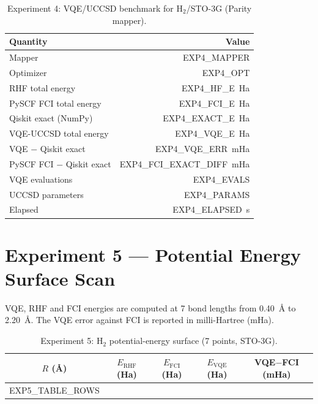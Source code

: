 \documentclass[11pt,a4paper]{article}
\begin{document}
\begin{table}[H]
\centering\small
\begin{tabular}{lr}
\toprule
Quantity & Value \\
\midrule
Mapper                           & EXP4\_MAPPER \\
Optimizer                        & EXP4\_OPT \\
RHF total energy                 & EXP4\_HF\_E~Ha \\
PySCF FCI total energy           & EXP4\_FCI\_E~Ha \\
Qiskit exact (NumPy)             & EXP4\_EXACT\_E~Ha \\
VQE-UCCSD total energy           & EXP4\_VQE\_E~Ha \\
VQE $-$ Qiskit exact             & EXP4\_VQE\_ERR~mHa \\
PySCF FCI $-$ Qiskit exact       & EXP4\_FCI\_EXACT\_DIFF~mHa \\
VQE evaluations                  & EXP4\_EVALS \\
UCCSD parameters                 & EXP4\_PARAMS \\
Elapsed                          & EXP4\_ELAPSED~s \\
\bottomrule
\end{tabular}
\caption{Experiment 4: VQE/UCCSD benchmark for H$_2$/STO-3G (Parity mapper).}
\end{table}

\section{Experiment 5 --- Potential Energy Surface Scan}

VQE, RHF and FCI energies are computed at 7 bond lengths from 0.40~\AA{} to
2.20~\AA. The VQE error against FCI is reported in milli-Hartree (mHa).

\begin{table}[H]
\centering\small\setlength{\tabcolsep}{5pt}
\begin{tabular}{S[table-format=1.3]
                S[table-format=2.10]
                S[table-format=2.10]
                S[table-format=2.10]
                S[table-format=+1.4]}
\toprule
{$R$ (\AA)} & {$E_\text{RHF}$ (Ha)} & {$E_\text{FCI}$ (Ha)}
            & {$E_\text{VQE}$ (Ha)} & {VQE$-$FCI (mHa)} \\
\midrule
EXP5\_TABLE\_ROWS
\bottomrule
\end{tabular}
\caption{Experiment 5: H$_2$ potential-energy surface (7 points, STO-3G).}
\end{table}
\end{document}
